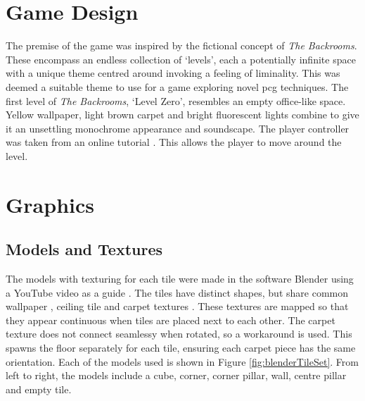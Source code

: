 
\section{Game Design}
The premise of the game was inspired by the fictional concept of \textit{The Backrooms}. These encompass an endless collection of `levels', each a potentially infinite space with a unique theme centred around invoking a feeling of liminality. This was deemed a suitable theme to use for a game exploring novel \acrlong{pcg} techniques. The first level of \textit{The Backrooms}, `Level Zero', resembles an empty office-like space. Yellow wallpaper, light brown carpet and bright fluorescent lights combine to give it an unsettling monochrome appearance and soundscape. The player controller was taken from an online tutorial \cite{FPS_controller_YouTube, FPS_controller_GitHub}. This allows the player to move around the level.



\section{Graphics}
\subsection{Models and Textures}
The models with texturing for each tile were made in the software Blender using a YouTube video as a guide \cite{backroomsGraphics}. The tiles have distinct shapes, but share common wallpaper \cite{sketchfab_texture}, ceiling tile \cite{ceiling_texture} and carpet textures \cite{carpet_texture}. These textures are mapped so that they appear continuous when tiles are placed next to each other. The carpet texture does not connect seamlessy when rotated, so a workaround is used. This spawns the floor separately for each tile, ensuring each carpet piece has the same orientation. Each of the models used is shown in Figure \ref{fig:blenderTileSet}. From left to right, the models include a cube, corner, corner pillar, wall, centre pillar and empty tile.


